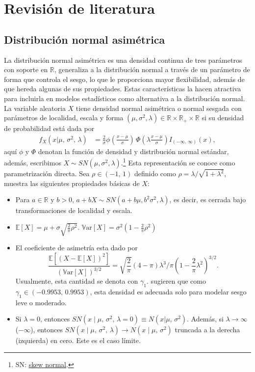 \documentclass[11pt]{article}
\begin{document}
\section{Revisión de literatura}
\label{sec:literatura}

\subsection{Distribución normal asimétrica}
\label{subsec:normal-sesgada}

La distribución normal asimétrica es una densidad continua de tres parámetros con soporte en $\mathbb{R}$, generaliza a la distribución normal a través de un parámetro de forma que controla el sesgo, lo que le proporciona mayor flexibilidad, además de que hereda algunas de sus propiedades. Estas características la hacen atractiva para incluirla en modelos estadísticos como alternativa a la distribución normal. La variable aleatoria $X$ tiene densidad normal asimétrica o normal sesgada con parámetros de localidad, escala y forma $(\mu, \sigma^{2}, \lambda)\in \mathbb{R}\times\mathbb{R}_{+}\times\mathbb{R}$ si su densidad de probabilidad está dada por
\begin{align}
\label{eq:sn-density}
f_{X}(x \vert \mu,\, \sigma^{2},\, \lambda) &= \frac{2}{\sigma} \phi\left(\frac{x-\mu}{\sigma}\right) \, \Phi\left(\lambda\frac{x-\mu}{\sigma}\right)I_{(-\infty,\, \infty)}(x),
\end{align}
aquí $\phi$ y $\Phi$ denotan la función de densidad y distribución normal estándar, además, escribimos $X\sim SN(\mu, \sigma^{2}, \lambda)$.\footnote{SN: \underline{skew normal}.} Esta representación se conoce como {parametrización directa}. Sea $\rho\in(-1,\, 1)$ definido como $\rho = \lambda/\sqrt{1+\lambda^{2}}$, \textcite{Azzalini:2013} muestra las siguientes propiedades básicas de $X$:
\begin{itemize}
\item Para $a\in\mathbb{R}$ y $b>0$, $a+bX \sim SN(a+b\mu, b^{2}\sigma^{2}, \lambda)$, es decir, es cerrada bajo transformaciones de localidad y escala.
\item $\mathbb{E}[X] = \mu + \sigma  \sqrt{\frac{2}{\pi}\rho^{2}}$. $\mathbb{V}\text{ar}[X] = \sigma^{2}\left(1 - \frac{2}{\pi}\rho^{2}\right)$
\item El coeficiente de asimetría esta dado por \[
\frac{\mathbb{E}[(X-\mathbb{E}[X])^{2}]}{(\mathbb{V}\text{ar}[X])^{3/2}} = \sqrt{\frac{2}{\pi}}(4-\pi)\lambda^{3}\big/\pi(1-\frac{2}{\pi}\lambda^{2})^{3/2}.\]
Usualmente, esta cantidad se denota con $\gamma_{1}$. \textcite{cristian-2007} sugieren que como $\gamma_{1}\in(-0.9953,\, 0.9953)$, esta densidad es adecuada solo para modelar sesgo leve o moderado.
\item Si $\lambda=0$, entonces $SN(x \mid \mu,\, \sigma^{2},\, \lambda=0) \equiv N(x \vert \mu,\, \sigma^{2})$. Además, si $\lambda\to\infty$ ($-\infty$), entonces $SN(x \mid \mu,\, \sigma^{2},\, \lambda) \to N(x \mid \mu,\, \sigma^{2})$ truncada a la derecha (izquierda) en cero. Este es el caso límite.
\end{itemize}
\end{document}
